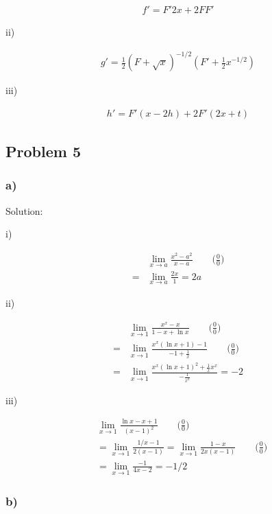 \documentclass[letterpaper, 11pt]{article}
\newcommand{\1}{\mathds{1}}	%
\theoremstyle{definition}
\begin{document}
\begin{align*}
  f' = F'2x + 2FF'
\end{align*}

ii)

\begin{align*}
  g' = \frac{1}{2} (F + \sqrt{x})^{-1/2} (F' + \frac{1}{2}x ^{-1/2})
\end{align*}

iii)

\begin{align*}
  h' = F'(x-2h) + 2F'(2x+t)
\end{align*}


\subsection*{Problem 5}

\subsubsection*{a)}

Solution:

i) 

\begin{align*}
  &\lim_{x \to a} \frac{x ^{2} - a ^{2}}{ x - a} \qquad\text{($\frac{0}{0}$)} \\
  = &\lim_{x \to a} \frac{2x}{1} = 2a
\end{align*}

ii)

\begin{align*}
  &\lim_{x \to 1} \frac{x ^{x} -x}{1-x + \ln x} \qquad\text{($\frac{0}{0}$)} \\
  =& \lim_{x \to 1} \frac{x ^{x}(\ln x + 1) - 1}{-1+\frac{1}{x}}\qquad\text{($\frac{0}{0}$)} \\ 
  =& \lim_{x \to 1} \frac{x ^{x}(\ln x + 1)^{2} + \frac{1}{x}x ^{x}}{- \frac{1}{x ^{2}}} = -2 
\end{align*}

iii)

\begin{align*}
  &\lim_{x \to 1} \frac{\ln x - x + 1}{(x - 1)^{2}} \qquad\text{($\frac{0}{0}$)}\\ 
  &= \lim_{x \to 1} \frac{1/x - 1}{2(x - 1)} = \lim_{x \to 1} \frac{1 - x}{2x(x-1)} \qquad\text{($\frac{0}{0}$)} \\
  &= \lim_{x \to 1} \frac{-1}{4x - 2} = -1/2  
\end{align*}

\subsubsection*{b)}
\end{document}
